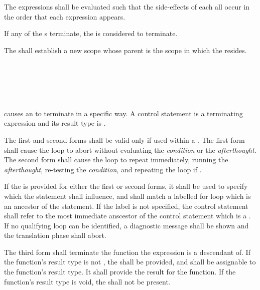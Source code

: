 \specsubsubitem
The expressions shall be evaluated such that the side-effects of each all occur
in the order that each expression appears.

\specsubsubitem
If any of the s terminate, the
 is considered to terminate.

\specsubsubitem
The  shall establish a new scope whose parent is
the scope in which the  resides.


\begin{grammar}
 \\
	  \\
	  \\
	  \\
\end{grammar}

\specsubsubitem
{} causes an  to
terminate in a specific way. A control statement is a terminating expression
and its result type is .

\specsubsubitem
The first and second forms shall be valid only if used within a
. The first form shall cause the loop to abort without
evaluating the \textit{condition} or the \textit{afterthought}. The second form
shall cause the loop to repeat immediately, running the \textit{afterthought},
re-testing the \textit{condition}, and repeating the loop if .

\specsubsubitem
If the  is provided for either the first or second forms, it
shall be used to specify which  the statement shall
influence, and shall match a labelled for loop which is an ancestor of the
statement. If the label is not specified, the control statement shall refer to
the most immediate anscestor of the control statement which is a
. If no qualifying loop can be identified, a diagnostic
message shall be shown and the translation phase shall abort.

\specsubsubitem
The third form shall terminate the function the expression is a descendant of.
If the function's result type is not , the
 shall be provided, and shall be assignable to
the function's result type. It shall provide the result for the function. If
the function's result type is void, the  shall
not be present.

